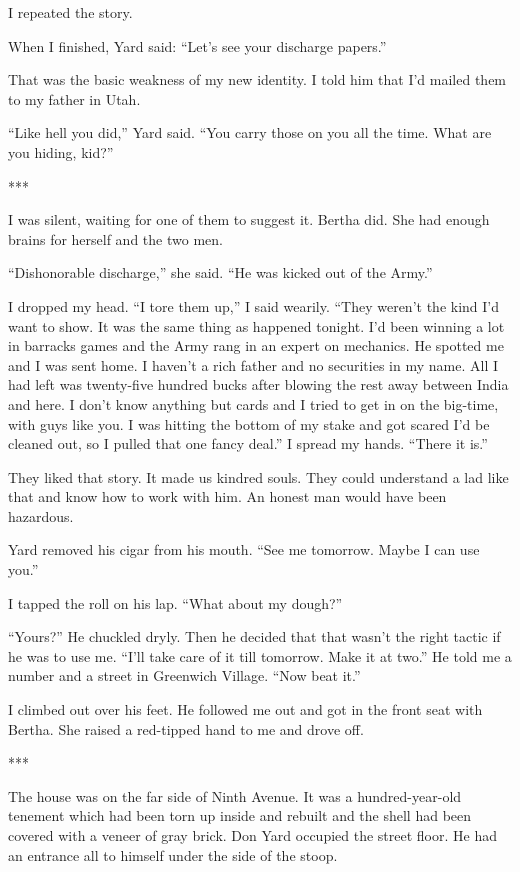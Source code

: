 \documentclass{novel}
\begin{document}
I repeated the story.

When I finished, Yard said: “Let’s see your discharge papers.”

That was the basic weakness of my new identity. I told him that I’d mailed them to my father in Utah.

“Like hell you did,” Yard said. “You carry those on you all the time. What are you hiding, kid?”

***

I was silent, waiting for one of them to suggest it. Bertha did. She had enough brains for herself and the two men.

“Dishonorable discharge,” she said. “He was kicked out of the Army.”

I dropped my head. “I tore them up,” I said wearily. “They weren’t the kind I’d want to show. It was the same thing as happened tonight. I’d been winning a lot in barracks games and the Army rang in an expert on mechanics. He spotted me and I was sent home. I haven’t a rich father and no securities in my name. All I had left was twenty-five hundred bucks after blowing the rest away between India and here. I don’t know anything but cards and I tried to get in on the big-time, with guys like you. I was hitting the bottom of my stake and got scared I’d be cleaned out, so I pulled that one fancy deal.” I spread my hands. “There it is.”

They liked that story. It made us kindred souls. They could understand a lad like that and know how to work with him. An honest man would have been hazardous.

Yard removed his cigar from his mouth. “See me tomorrow. Maybe I can use you.”

I tapped the roll on his lap. “What about my dough?”

“Yours?” He chuckled dryly. Then he decided that that wasn’t the right tactic if he was to use me. “I’ll take care of it till tomorrow. Make it at two.” He told me a number and a street in Greenwich Village. “Now beat it.”

I climbed out over his feet. He followed me out and got in the front seat with Bertha. She raised a red-tipped hand to me and drove off.

***

The house was on the far side of Ninth Avenue. It was a hundred-year-old tenement which had been torn up inside and rebuilt and the shell had been covered with a veneer of gray brick. Don Yard occupied the street floor. He had an entrance all to himself under the side of the stoop.
\end{document}
